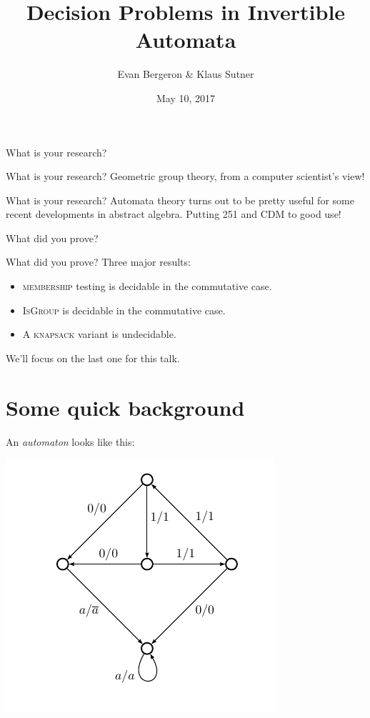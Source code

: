 \documentclass{beamer}
\title{Decision Problems in Invertible Automata}
\date{May 10, 2017}
\author{Evan Bergeron \& Klaus Sutner}
\institute{Carnegie Mellon University}
\begin{document}
\maketitle

\begin{frame}[standout]
  What is your research?
\end{frame}

\begin{frame}{What is your research?}
  Geometric group theory, from a computer scientist's view!
\end{frame}

\begin{frame}{What is your research?}
  Automata theory turns out to be pretty useful for some recent
  developments in abstract algebra. Putting 251 and CDM to good use!
\end{frame}

\begin{frame}[standout]
  What did you prove?
\end{frame}

\begin{frame}{What did you prove?}
  Three major results:
  \begin{itemize}
  \item \textsc{membership} testing is decidable in the commutative
    case.
  \item \textsc{IsGroup} is decidable in the commutative case.
  \item A \textsc{knapsack} variant is undecidable.
  \end{itemize}
  We'll focus on the last one for this talk.
\end{frame}

\section{Some quick background}

\begin{frame}
  An \emph{automaton} looks like this:
  \begin{center}
    \includegraphics[scale=0.4]{../figures/grigorchuk}
  \end{center}
\end{frame}
\end{document}
